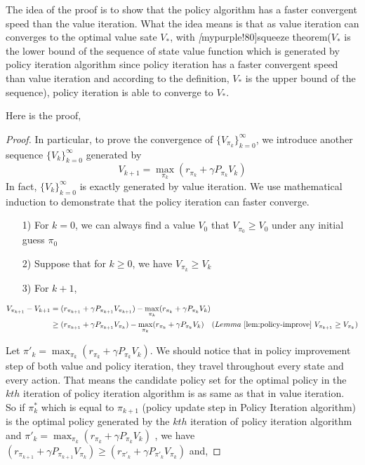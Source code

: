 \begin{remark}
    The idea of the proof is to show that the policy algorithm has a faster convergent speed than the value iteration. What the idea means is that as value iteration can converges to the optimal value sate $V_{*}$, with \emph[mypurple!80]{squeeze theorem}($V_{*}$ is the lower bound of the sequence of state value function which is generated by policy iteration algorithm since policy iteration has a faster convergent speed than value iteration and according to the definition, $V_{*}$ is the upper bound of the sequence), policy iteration is able to converge to $V_{*}$.
\end{remark}
Here is the proof,
\begin{proof}
    In particular, to prove the convergence of $\{V_{\pi_{k}}\}_{k=0}^{\infty}$, we introduce another sequence $\{V_{k}\}_{k=0}^{\infty}$ generated by
    \begin{equation}
    V_{k+1}=\max_{\pi_{k}}\left(r_{\pi_{k}}+\gamma P_{\pi_{k}}V_{k}\right)
    \end{equation}
    In fact, $\{V_{k}\}_{k=0}^{\infty}$ is exactly generated by value iteration. We use mathematical induction to demonstrate that the policy iteration can faster converge.
    \begin{enumerate}
        \item[1)] For $k=0$, we can always find a value $V_{0}$ that $V_{\pi_{0}} \ge V_{0}$ under any initial guess $\pi_{0}$
        \item[2)] Suppose that for $k\ge 0$, we have $V_{\pi_{k}}\ge V_{k}$
        \item[3)] For $k+1$, 
    \end{enumerate} 
    \begin{align*}
        V_{\pi_{k+1}}-V_{k+1} &= (r_{\pi_{k+1}}+\gamma P_{\pi_{k+1}}V_{\pi_{k+1}})-\max_{\pi_{k}}(r_{\pi_{k}}+\gamma P_{\pi_{k}}V_{k}) \\
                              &\ge (r_{\pi_{k+1}}+\gamma P_{\pi_{k+1}}V_{\pi_{k}})-\max_{\pi_{k}}(r_{\pi_{k}}+\gamma P_{\pi_{k}}V_{k}) \quad(Lemma\ \ref{lem:policy-improve}\ V_{\pi_{k+1}}\ge V_{\pi_{k}})\\
    \end{align*}

    Let $\pi'_{k}=\max_{\pi_{k}}(r_{\pi_{k}}+\gamma P_{\pi_{k}}V_{k})$. We should notice that in policy improvement step of both value and policy iteration, they travel throughout every state and every action. That means the candidate policy set for the optimal policy in the $kth$ iteration of policy iteration algorithm is as same as that in value iteration. \\[6pt]
    So if $\pi^*_{k}$ which is equal to $\pi_{k+1}$ (policy update step in Policy Iteration algorithm) is the optimal policy generated by the $kth$ iteration of policy iteration algorithm and $\pi'_{k}=\max_{\pi_{k}}(r_{\pi_{k}}+\gamma P_{\pi_{k}}V_{k})$ , we have $(r_{\pi_{k+1}}+\gamma P_{\pi_{k+1}}V_{\pi_{k}}) \ge (r_{\pi'_{k}}+\gamma P_{\pi'_{k}}V_{\pi_{k}})$ and,


\end{proof}
